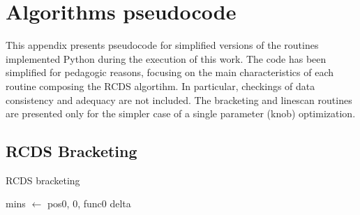 \chapter{Algorithms pseudocode}
This appendix presents pseudocode for simplified versions of the routines implemented Python during the execution of this work. The code has been simplified for pedagogic reasons, focusing on the main characteristics of each routine composing the RCDS algortihm. In particular, checkings of data consistency and adequacy are not included. The bracketing and linescan routines are presented only for the simpler case of a single parameter (knob) optimization.
\section{RCDS Bracketing}
\begin{algorithm}
    \caption{RCDS bracketing}\label{alg:brackets}
    \begin{algorithmic}
        \State mins $\gets$ pos0, 0, func0
        \State delta
    \EndFunction
    \end{algorithmic}
    \end{algorithm}

